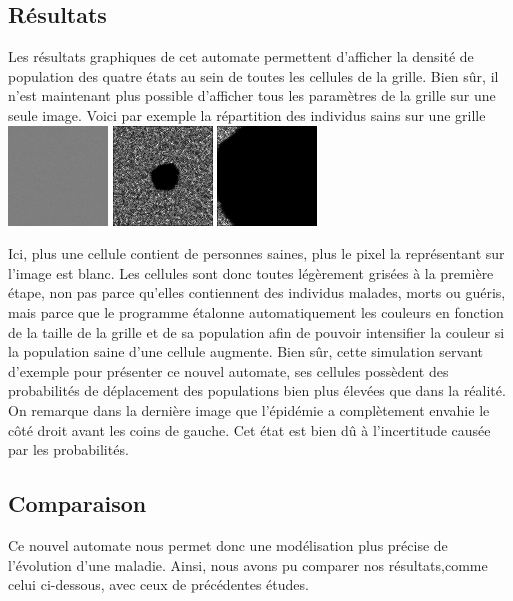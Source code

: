 \documentclass{article}
\begin{document}
\subsection{Résultats}

Les résultats graphiques de cet automate permettent d'afficher la densité de population des quatre états au sein de toutes les cellules de la grille. Bien sûr, il n'est maintenant plus possible d'afficher tous les paramètres de la grille sur une seule image. Voici par exemple la répartition des individus sains sur une grille \\[0.6cm]

\includegraphics[scale=2]{../images/Frame-1.png} 
\includegraphics[scale=2]{../images/Frame-58.png} 
\includegraphics[scale=2]{../images/Frame-221.png}


Ici, plus une cellule contient de personnes saines, plus le pixel la représentant sur l'image est blanc. Les cellules sont donc toutes légèrement grisées à la première étape, non pas parce qu'elles contiennent des individus malades, morts ou guéris, mais parce que le programme étalonne automatiquement les couleurs en fonction de la taille de la grille et de sa population afin de pouvoir intensifier la couleur si la population saine d'une cellule augmente.
Bien sûr, cette simulation servant d'exemple pour présenter ce nouvel automate, ses cellules possèdent des probabilités de déplacement des populations bien plus élevées que dans la réalité.
On remarque dans la dernière image que l'épidémie a complètement envahie le côté droit avant les coins de gauche. Cet état est bien dû à l'incertitude causée par les probabilités.
 \subsection{Comparaison}
Ce nouvel automate nous permet donc une modélisation plus précise de l'évolution d'une maladie. Ainsi, nous avons pu comparer nos résultats,comme celui ci-dessous, avec ceux de précédentes études.
\end{document}
